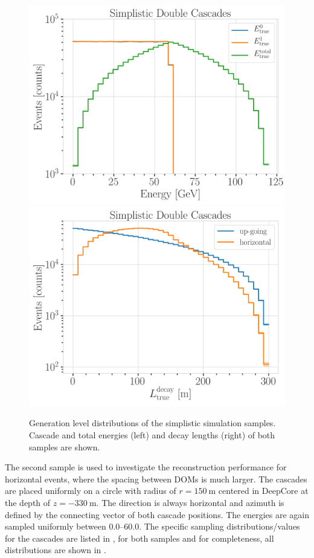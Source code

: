 \begin{figure}[h]
    \centering
    \includegraphics[width=.49\linewidth]{figures/model_independent_simulation/gen_level/simplistic_1_d_distr_all_energies.png}
    \includegraphics[width=.49\linewidth]{figures/model_independent_simulation/gen_level/simplistic_1_d_distr_true_decay_length.png}
    \caption[Simplified model-independent simulation generation level distributions]{Generation level distributions of the simplistic simulation samples. Cascade and total energies (left) and decay lengths (right) of both samples are shown.}
\end{figure}

The second sample is used to investigate the reconstruction performance for horizontal events, where the spacing between DOMs is much larger. The cascades are placed uniformly on a circle with radius of $r=\SI{150}{\meter}$ centered in DeepCore at the depth of $z=\SI{-330}{\meter}$. The direction is always horizontal and azimuth is defined by the connecting vector of both cascade positions. The energies are again sampled uniformly between \SIrange[range-phrase={~and~}]{0.0}{60.0}{\gev}. The specific sampling distributions/values for the cascades are listed in , for both samples and for completeness, all distributions are shown in .

